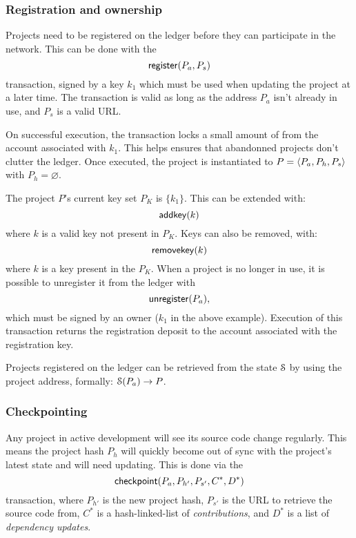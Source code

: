 \subsubsection{Registration and ownership} Projects need to be
registered on the ledger before they can participate in the
network. This can be done with the
\[
    \mathsf{register}\lparen P_a, P_s\rparen
\]
transaction, signed by a key $k_1$ which must be used when updating the project
at a later time. The transaction is valid as long as the address $P_a$ isn't
already in use, and $P_s$ is a valid URL.

On successful execution, the transaction locks a small amount of \oscoin{} from
the account associated with $k_1$. This helps ensures that abandonned projects
don't clutter the ledger.  Once executed, the project is instantiated to $P =
\langle P_a, P_h, P_s\rangle$ with $P_h = \varnothing$.

The project $P$'s current key set $P_K$ is $\{k_1\}$. This can be extended
with:
\[
    \mathsf{addkey}\lparen k\rparen
\]
where $k$ is a valid key not present in $P_K$. Keys can also be removed, with:
\[
    \mathsf{removekey}\lparen k\rparen
\]
where $k$ is a key present in the $P_K$.
When a project is no longer in use, it is possible to unregister it from the
ledger with
\[
    \mathsf{unregister}\lparen P_a\rparen,
\]
which must be signed by an owner ($k_1$ in the above example).
Execution of this transaction returns the registration deposit to the account
associated with the registration key.

Projects registered on the ledger can be retrieved from the state $\mathcal{S}$ by
using the project address, formally: $\mathcal{S}(P_a) \to P$.

\subsubsection{Checkpointing} \label{s:checkpointing} Any project in active
development will see its source code change regularly. This means the project
hash $P_h$ will quickly become out of sync with the project's latest state and
will need updating. This is done via the
\[
    \mathsf{checkpoint}\lparen P_a, P_{h'}, P_{s'}, C^*, D^*\rparen
\]
transaction, where $P_{h'}$ is the new project hash, $P_{s'}$ is the URL to
retrieve the source code from, $C^*$ is a hash-linked-list of
\emph{contributions}, and $D^*$ is a list of \emph{dependency updates}.

